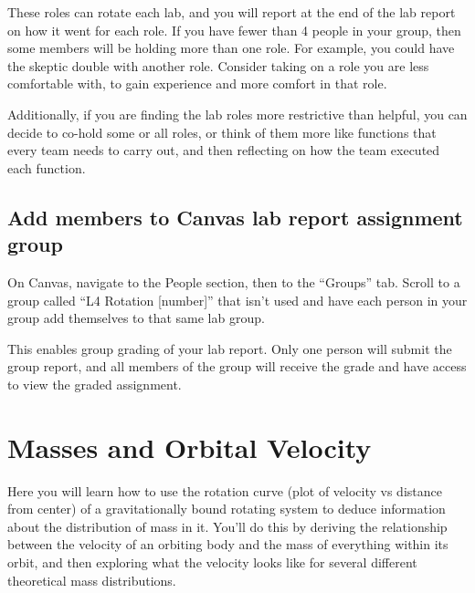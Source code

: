 These roles can rotate each lab, and you will report at the end of the lab report on how it went for each role. If you have fewer than 4 people in your group, then some members will be holding more than one role. For example, you could have the skeptic double with another role. Consider taking on a role you are less comfortable with, to gain experience and more comfort in that role.

Additionally, if you are finding the lab roles more restrictive than helpful, you can decide to co-hold some or all roles, or think of them more like functions that every team needs to carry out, and then reflecting on how the team executed each function.

\subsection{Add members to Canvas lab report assignment group}

\begin{steps}
	\item On Canvas, navigate to the People section, then to the ``Groups'' tab. Scroll to a group called ``L4 Rotation [number]'' that isn't used and have each person in your group add themselves to that same lab group.
\end{steps}

This enables group grading of your lab report. Only one person will submit the group report, and all members of the group will receive the grade and have access to view the graded assignment.

\section{Masses and Orbital Velocity} %

Here you will learn how to use the rotation curve (plot of velocity vs distance from center) of a gravitationally bound rotating system to deduce information about the distribution of mass in it. You'll do this by deriving the relationship between the velocity of an orbiting body and the mass of everything within its orbit, and then exploring what the velocity looks like for several different theoretical mass distributions.



